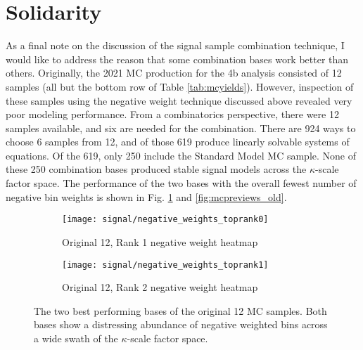 \FloatBarrier
\section{Solidarity} \label{sec:solidarity}
    
    As a final note on the discussion of the signal sample combination technique,
        I would like to address the reason that some combination bases work better than others.
    Originally, the 2021 MC production for the 4b analysis consisted of 12 samples (all but the bottom row of Table \ref{tab:mcyields}).
    However, inspection of these samples using the negative weight technique discussed above revealed very poor modeling performance.
    From a combinatorics perspective, there were 12 samples available, and six are needed for the combination.
    There are 924 ways to choose 6 samples from 12, and of those 619 produce linearly solvable systems of equations.
    Of the 619, only 250 include the Standard Model MC sample.
    None of these 250 combination bases produced stable signal models across the $\kappa$-scale factor space.
    The performance of the two bases with the overall fewest number of negative bin weights is shown in Fig. \ref{fig:mcnWeight_old} and \ref{fig:mcpreviews_old}.

    \begin{figure}[tbh]
    	\centering
        \begin{subfigure}{0.44\textwidth}
            \texttt{[image: signal/negative\_weights\_toprank0]}
            \captionsetup{justification=centering} \caption{Original 12, Rank 1 negative weight heatmap}
        \end{subfigure}
        \begin{subfigure}{0.44\textwidth}
            \texttt{[image: signal/negative\_weights\_toprank1]}
            \captionsetup{justification=centering} \caption{Original 12, Rank 2 negative weight heatmap}
        \end{subfigure}
        \caption{
            The two best performing bases of the original 12 MC samples.
            Both bases show a distressing abundance of negative weighted bins across a wide swath of the $\kappa$-scale factor space.
        }
        \label{fig:mcnWeight_old}
    \end{figure}


